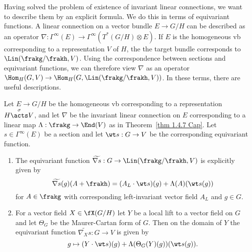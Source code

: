 Having solved the problem of existence of invariant linear connections, we want to describe them by an explicit formula. We do this in terms of equivariant functions. A linear connection on a vector bundle $E\to G\slash H$ can be described as an operator $\nabla:\Gamma^\infty(E)\to \Gamma^\infty(T^\ast(G\slash H)\otimes E)$. If $E$ is the homogeneous \gls{vb} corresponding to a representation $V$ of $H$, the the target bundle corresponds to $\Lin(\frakg\slash\frakh,V)$. Using the correspondence between sections and equivariant functions, we can therefore view $\nabla$ as an operator $\Hom_H(G,V)\to \Hom_H(G,\Lin(\frakg\slash\frakh,V))$. In these terms, there are useful descriptions.

\begin{prop}\label{prop 1.4.7 Cap}
    Let $E\to G\slash H$ be the homogeneous \gls{vb} corresponding to a representation $H\overset{\sigma}{\acts}V$, and let $\nabla$ be the invariant linear connection on $E$ corresponding to a linear map $\Lambda:\frakg\to \End(V)$ as in Theorem~\ref{thm 1.4.7 Cap}. Let $s\in\Gamma^\infty(E)$ be a section and let $\wt s:G\to V$ be the corresponding equivariant function.

    \begin{enumerate}[label=(\arabic*)]
        \item The equivariant function $\widetilde{\nabla s}:G\to \Lin(\frakg\slash\frakh,V)$ is explicitly given by 
        \[\widetilde{\nabla s}(g)(A+\frakh)=(A_L\cdot \wt s)(g)+\Lambda(A)(\wt s(g))\]
        for $A\in\frakg$ with corresponding left-invariant vector field $A_L$ and $g\in G$.
        \item For a vector field $X\in\fX(G\slash H)$ let $Y$ be a local lift to a vector field on $G$ and let $\Theta_G$ be the Maurer-Cartan form of $G$. Then on the domain of $Y$ the equivariant function $\widetilde{\nabla_X s}:G\to V$ is given by 
        \[g\mapsto (Y\cdot \wt s)(g)+\Lambda(\Theta_G(Y)(g))(\wt s(g)).\]
    \end{enumerate}
\end{prop}

